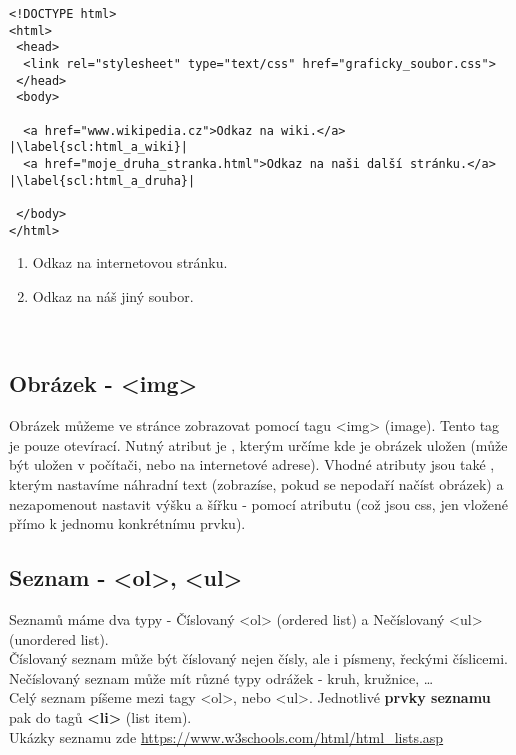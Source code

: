 \begin{minipage}[t]{.45\textwidth}
\begin{code}
\begin{verbatim}
<!DOCTYPE html> 
<html> 
 <head> 
  <link rel="stylesheet" type="text/css" href="graficky_soubor.css"> 
 </head> 
 <body> 
 
  <a href="www.wikipedia.cz">Odkaz na wiki.</a> |\label{scl:html_a_wiki}|
  <a href="moje_druha_stranka.html">Odkaz na naši další stránku.</a> |\label{scl:html_a_druha}|

 </body>
</html> 
\end{verbatim}

\label{code:html_odkaz}
\end{code}
\end{minipage}
\begin{minipage}[t]{.45\textwidth}
\begin{enumerate}
\vspace{-0.4cm}
\item[ř. \ref{scl:html_a_wiki}:] Odkaz na internetovou stránku.
\item[ř. \ref{scl:html_a_druha}:] Odkaz na náš jiný soubor.
\end{enumerate}
\end{minipage}\\

\subsection{Obrázek - <img>}
Obrázek můžeme ve stránce zobrazovat pomocí tagu <img> (image). Tento tag je pouze otevírací. Nutný atribut je , kterým určíme kde je obrázek uložen (může být uložen v počítači, nebo na internetové adrese). Vhodné atributy jsou také , kterým nastavíme náhradní text (zobrazíse, pokud se nepodaří načíst obrázek) a nezapomenout nastavit výšku a šířku - pomocí atributu  (což jsou css, jen vložené přímo k jednomu konkrétnímu prvku).

\subsection{Seznam - <ol>, <ul>}
Seznamů máme dva typy - Číslovaný <ol> (ordered list) a Nečíslovaný <ul> (unordered list).\\
Číslovaný seznam může být číslovaný nejen čísly, ale i písmeny, řeckými číslicemi.\\
Nečíslovaný seznam může mít různé typy odrážek - kruh, kružnice, \dots \\
Celý seznam  píšeme mezi tagy <ol>, nebo <ul>. Jednotlivé \textbf{prvky seznamu} pak do tagů \textbf{<li>} (list item).\\
Ukázky seznamu zde \url{https://www.w3schools.com/html/html_lists.asp}

